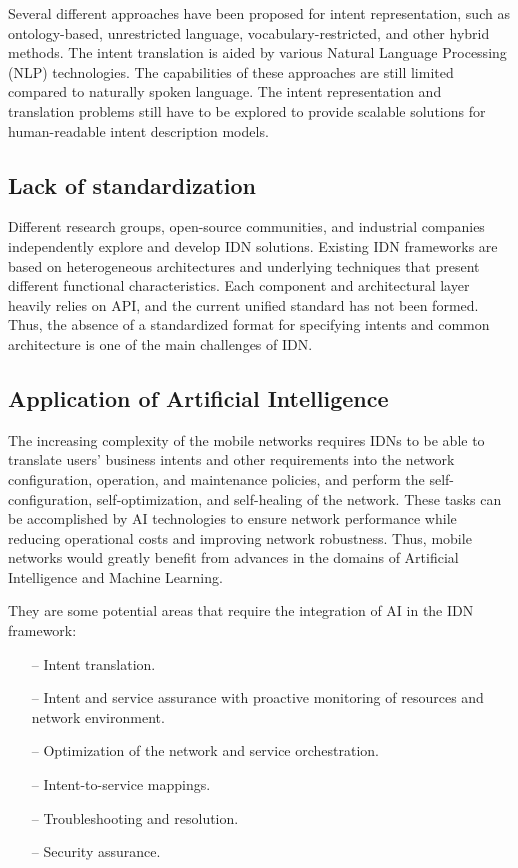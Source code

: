 Several different approaches have been proposed for intent representation, such as ontology-based, unrestricted language, vocabulary-restricted, and other hybrid methods. The intent translation is aided by various Natural Language Processing (NLP) technologies. The capabilities of these approaches are still limited compared to naturally spoken language. The intent representation and translation problems still have to be explored to provide scalable solutions for human-readable intent description models.\cite[18]{Mehmood2021} 

\subsection{Lack of standardization}
Different research groups, open-source communities, and industrial companies independently explore and develop IDN solutions. Existing IDN frameworks are based on heterogeneous architectures and underlying techniques that present different functional characteristics. Each component and architectural layer heavily relies on API, and the current unified standard has not been formed. Thus, the absence of a standardized format for specifying intents and common architecture is one of the main challenges of IDN.\cite{8968429}

\subsection{Application of Artificial Intelligence}
The increasing complexity of the mobile networks requires IDNs to be able to translate users' business intents and other requirements into the network configuration, operation, and maintenance policies, and perform the self-configuration, self-optimization, and self-healing of the network. These tasks can be accomplished by AI technologies to ensure network performance while reducing operational costs and improving network robustness. Thus, mobile networks would greatly benefit from advances in the domains of Artificial Intelligence and Machine Learning.\cite{Wei2020}

They are some potential areas that require the integration of AI in the IDN framework:
\begin{itemize}
\item[--] Intent translation.
\item[--] Intent and service assurance with proactive monitoring of resources and network environment.
\item[--] Optimization of the network and service orchestration.
\item[--] Intent-to-service mappings.
\item[--] Troubleshooting and resolution.
\item[--] Security assurance.
\end{itemize}

